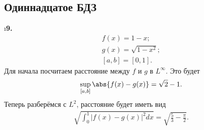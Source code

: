 \subsection{Одиннадцатое БДЗ}

\setcounter{iii}{25}


\i \textbf{9.}
\begin{gather*}
    f(x) = 1 - x;\\
    g(x) = \sqrt{1-x^2};\\
    [a, b] = [0, 1].
\end{gather*}
Для начала посчитаем расстояние между $f$ и $g$ в $L^\infty$. Это будет 
\begin{gather*}
    \sup_{[a,b]}\abs{f(x) - g(x)} = \sqrt{2} - 1.
\end{gather*}
Теперь разберёмся с $L^2$, расстояние будет иметь вид
\begin{gather*}
    \sqrt{\int_0^1|f(x) - g(x)|^2dx} = \sqrt{\frac{5}{3} - \frac{\pi}{2}}.
\end{gather*}


